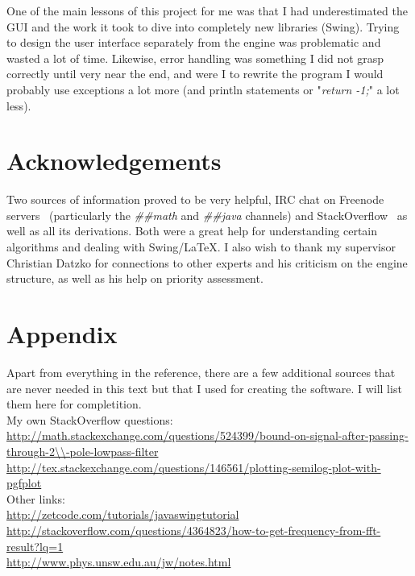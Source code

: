 \documentclass[11pt,a4paper]{article}
\begin{document}
One of the main lessons of this project for me was that I had underestimated the GUI and the work it took to dive into completely new libraries (Swing). Trying to design the user interface separately from the engine was problematic and wasted a lot of time. Likewise, error handling was something I did not grasp correctly until very near the end, and were I to rewrite the program I would probably use exceptions a lot more (and println statements or "\emph{return -1;}" a lot less).

\section{Acknowledgements}

Two sources of information proved to be very helpful, IRC chat on Freenode servers~\cite{Freenode} (particularly the \emph{\#\#math} and \emph{\#\#java} channels) and StackOverflow~\cite{Stackoverflow} as well as all its derivations. Both were a great help for understanding certain algorithms and dealing with Swing/LaTeX.
I also wish to thank my supervisor Christian Datzko for connections to other experts and his criticism on the engine structure, as well as his help on priority assessment.



\appendix
\section{Appendix}
Apart from everything in the reference, there are a few additional sources that are never needed in this text but that I used for creating the software. I will list them here for completition.
\\My own StackOverflow questions:
\\\url{http://math.stackexchange.com/questions/524399/bound-on-signal-after-passing-through-2\\-pole-lowpass-filter}
\\\url{http://tex.stackexchange.com/questions/146561/plotting-semilog-plot-with-pgfplot}
\\Other links:
\\\url{http://zetcode.com/tutorials/javaswingtutorial}
\\\url{http://stackoverflow.com/questions/4364823/how-to-get-frequency-from-fft-result?lq=1}
\\\url{http://www.phys.unsw.edu.au/jw/notes.html}
\end{document}
